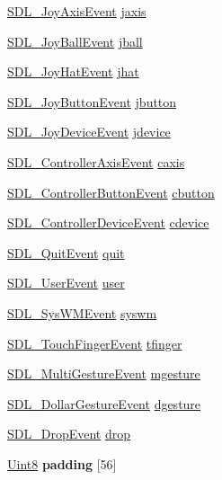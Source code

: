 \begin{DoxyCompactItemize}
\item 
\hyperlink{struct_s_d_l___joy_axis_event}{S\+D\+L\+\_\+\+Joy\+Axis\+Event} \hyperlink{union_s_d_l___event_ac4611acd0e9c675e67dc20919f0accb4}{jaxis}
\item 
\hyperlink{struct_s_d_l___joy_ball_event}{S\+D\+L\+\_\+\+Joy\+Ball\+Event} \hyperlink{union_s_d_l___event_ae433f511e3383d17f8fe02df745ee8f8}{jball}
\item 
\hyperlink{struct_s_d_l___joy_hat_event}{S\+D\+L\+\_\+\+Joy\+Hat\+Event} \hyperlink{union_s_d_l___event_a421b40e0f8e01f181c8d5548cff1dd1d}{jhat}
\item 
\hyperlink{struct_s_d_l___joy_button_event}{S\+D\+L\+\_\+\+Joy\+Button\+Event} \hyperlink{union_s_d_l___event_a591104d64903ae1cf70874fb5d3124ff}{jbutton}
\item 
\hyperlink{struct_s_d_l___joy_device_event}{S\+D\+L\+\_\+\+Joy\+Device\+Event} \hyperlink{union_s_d_l___event_a17514dc19a846ea1b5fbe44123700c4c}{jdevice}
\item 
\hyperlink{struct_s_d_l___controller_axis_event}{S\+D\+L\+\_\+\+Controller\+Axis\+Event} \hyperlink{union_s_d_l___event_aa8f6df0f2716fae56204b12ab4a4c289}{caxis}
\item 
\hyperlink{struct_s_d_l___controller_button_event}{S\+D\+L\+\_\+\+Controller\+Button\+Event} \hyperlink{union_s_d_l___event_aee2b5671c8dcdb447023715cc21593cb}{cbutton}
\item 
\hyperlink{struct_s_d_l___controller_device_event}{S\+D\+L\+\_\+\+Controller\+Device\+Event} \hyperlink{union_s_d_l___event_ad3beed01e690b885728e0b0e1d636378}{cdevice}
\item 
\hyperlink{struct_s_d_l___quit_event}{S\+D\+L\+\_\+\+Quit\+Event} \hyperlink{union_s_d_l___event_a102a3008afe67a1c02ae7504e232dcef}{quit}
\item 
\hyperlink{struct_s_d_l___user_event}{S\+D\+L\+\_\+\+User\+Event} \hyperlink{union_s_d_l___event_ab7c394e3ce7bf1e4f8d68bc0e9f1b042}{user}
\item 
\hyperlink{struct_s_d_l___sys_w_m_event}{S\+D\+L\+\_\+\+Sys\+W\+M\+Event} \hyperlink{union_s_d_l___event_ab3b2eaf5348d4c50a51b1f297fdef537}{syswm}
\item 
\hyperlink{struct_s_d_l___touch_finger_event}{S\+D\+L\+\_\+\+Touch\+Finger\+Event} \hyperlink{union_s_d_l___event_ab18d7d60794cb056948ffa58541bc3c5}{tfinger}
\item 
\hyperlink{struct_s_d_l___multi_gesture_event}{S\+D\+L\+\_\+\+Multi\+Gesture\+Event} \hyperlink{union_s_d_l___event_ac19b3c6a6b5181a51eb4fbe2cbe726a9}{mgesture}
\item 
\hyperlink{struct_s_d_l___dollar_gesture_event}{S\+D\+L\+\_\+\+Dollar\+Gesture\+Event} \hyperlink{union_s_d_l___event_a4481167b9f8549aeb254e97ca812e74d}{dgesture}
\item 
\hyperlink{struct_s_d_l___drop_event}{S\+D\+L\+\_\+\+Drop\+Event} \hyperlink{union_s_d_l___event_acff77bccbca65abbb876360a3f5209c9}{drop}
\item 
\hypertarget{union_s_d_l___event_aabb599570edfa54aad6255c1f24f2ad2}{}\hyperlink{_s_d_l__stdinc_8h_a2944638813a090aa23e62f4da842c3e2}{Uint8} {\bfseries padding} \mbox{[}56\mbox{]}\label{union_s_d_l___event_aabb599570edfa54aad6255c1f24f2ad2}


\end{DoxyCompactItemize}
